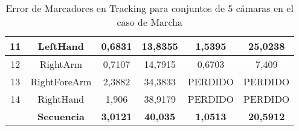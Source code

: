 \begin{table}[h]
\begin{tabular}{c|c|c|c|c|c|}
\multicolumn{1}{|c|}{11} & LeftHand & 0,6831 & 13,8355 & 1,5395 & 25,0238 \\ \hline
\multicolumn{1}{|c|}{12} & RightArm & 0,7107 & 14,7915 & 0,6703 & 7,409 \\ \hline
\multicolumn{1}{|c|}{13} & RightForeArm & 2,3882 & 34,3833 & PERDIDO & PERDIDO \\ \hline
\multicolumn{1}{|c|}{14} & RightHand & 1,906 & 38,9179 & PERDIDO & PERDIDO \\ \hline
 & \textbf{Secuencia} & \textbf{3,0121} & \textbf{40,035} & \textbf{1,0513} & \textbf{20,5912} \\ \cline{2-6} 
\end{tabular}
\caption{Error de Marcadores en Tracking para conjuntos de 5 cámaras en el caso de Marcha}
\label{error_captura_marcha_5_camaras}
\end{table}

